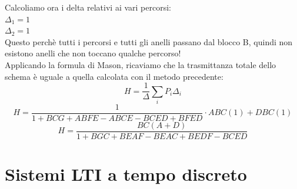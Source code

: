 \documentclass[12pt,a4paper]{article}
\begin{document}
	Calcoliamo ora i delta relativi ai vari percorsi: \\
	$\Delta_1 = 1$\\
	$\Delta_2 = 1$\\
	Questo perch\`e tutti i percorsi e tutti gli anelli passano dal blocco B, quindi non esistono anelli che non toccano qualche percorso!\\
	Applicando la formula di Mason, ricaviamo che la trasmittanza totale dello schema \`e uguale a quella calcolata con il metodo precedente:
	\[
		H = \frac{1}{\Delta}\sum_i P_i\Delta_i
	\]
	\[
		H = \frac{1}{1+BCG+ABFE-ABCE-BCED+BFED}\cdot ABC(1) + DBC(1)
	\]
	\[
		H = \frac{BC(A+D)}{1+BGC+BEAF-BEAC+BEDF-BCED}
	\]
	\newpage
	\section*{Sistemi LTI a tempo discreto}
\end{document}

